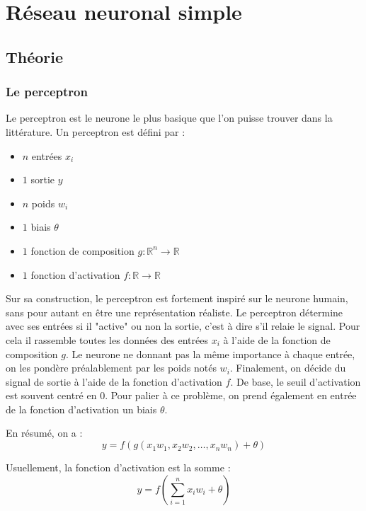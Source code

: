
\chapter{Réseau neuronal simple}

\section{Théorie}

\subsection{Le perceptron}

Le perceptron est le neurone le plus basique que l'on puisse trouver dans la
littérature. Un perceptron est défini par :
\begin{itemize}
\item $n$ entrées $x_i$
\item $1$ sortie $y$
\item $n$ poids $w_i$
\item $1$ biais $\theta$
\item $1$ fonction de composition $g : \mathbb{R}^n \to \mathbb{R}$
\item $1$ fonction d'activation $f : \mathbb{R} \to \mathbb{R}$
\end{itemize}

\vspace{\parskip}
Sur sa construction, le perceptron est fortement inspiré sur le neurone humain,
sans pour autant en être une représentation réaliste.
Le perceptron détermine avec ses entrées si il "active" ou non la sortie, c'est
à dire s'il relaie le signal. Pour cela il rassemble toutes les données des
entrées $x_i$ à l'aide de la fonction de composition $g$. Le neurone ne donnant
pas la même importance à chaque entrée, on les pondère préalablement par les
poids notés $w_i$.
Finalement, on décide du signal de sortie à l'aide de la fonction d'activation
$f$. De base, le seuil d'activation est souvent centré en $0$. Pour palier à ce
problème, on prend également en entrée de la fonction d'activation un biais
$\theta$.

\medskip

En résumé, on a :
\[y = f(g(x_1w_1, x_2w_2, \ldots , x_nw_n) + \theta) \]

\medskip

Usuellement, la fonction d'activation est la somme :
\[y = f(\sum_{i=1}^n x_iw_i + \theta) \]

